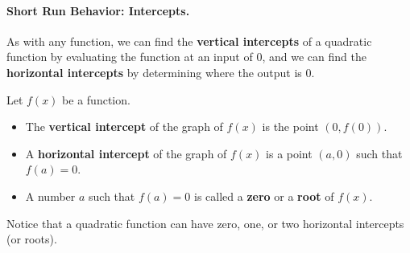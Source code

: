 \paragraph*{Short Run Behavior: Intercepts.}
As with any function, we can find the {\bf vertical intercepts} of a quadratic function by evaluating the function at an input of 0, and we can find the {\bf horizontal intercepts} by determining where the output is 0.
\begin{definition}
	Let $f(x)$ be a function.
	\begin{itemize}
		\item The {\bf vertical intercept} of the graph of $f(x)$ is the point $(0, f(0))$.
		\item A {\bf horizontal intercept} of the graph of $f(x)$ is a point $(a, 0)$ such that $f(a)=0$.
		\item A number $a$ such that $f(a) = 0$ is called a {\bf zero} or a {\bf root} of $f(x)$.
	\end{itemize}
\end{definition}
\noindent Notice that a quadratic function can have zero, one, or two horizontal intercepts (or roots).
